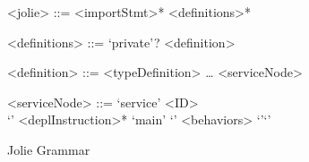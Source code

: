\begin{figure}[h]
    \begin{framed}
        \begin{grammar}
            <jolie> ::= <importStmt>* <definitions>* 

            <definitions> ::= `private'? <definition>

            <definition> ::=  <typeDefinition>
            \dots
            \alt <serviceNode>

            <serviceNode> ::= `service' <ID> \\ `{' <deplInstruction>* `main' `{' <behaviors> `}'`}'

        \end{grammar}
    \end{framed}
    \caption{Jolie Grammar}
    \label{fig:JolieGrammar}
\end{figure}


